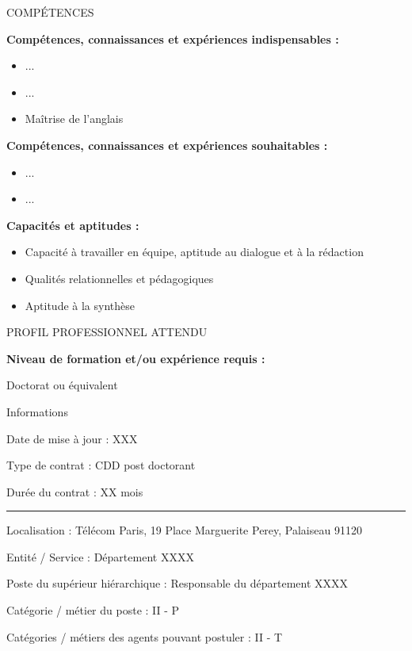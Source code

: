 \begin{graybox}{COMPÉTENCES}

{\bf Compétences, connaissances et expériences indispensables :}


\begin{itemize}
    \item ...
    \item ...
    \item Maîtrise de l'anglais
\end{itemize}

{\bf Compétences, connaissances et expériences souhaitables :}

\begin{itemize}
    \item ...
    \item ...
\end{itemize}


{\bf Capacités et aptitudes :}

\begin{itemize}
        \item  Capacité à travailler en équipe, aptitude au dialogue et à la rédaction
        \item  Qualités relationnelles et pédagogiques
        \item  Aptitude à la synthèse

\end{itemize}

\end{graybox}


\begin{graybox}{PROFIL PROFESSIONNEL ATTENDU  }

\textbf{Niveau de formation et/ou expérience requis :}

Doctorat ou équivalent 

\end{graybox}


\begin{redbox}{Informations}


Date de mise à jour :		XXX

Type de contrat : CDD post doctorant

Durée du contrat : XX mois

{ \color{redtp} \hspace{-5mm}\rule{1.073\linewidth}{0.5mm}}


Localisation :		Télécom Paris, 19 Place Marguerite Perey, Palaiseau 91120

Entité / Service : 	 Département XXXX

Poste du supérieur hiérarchique :	Responsable du département XXXX

Catégorie / métier du poste :	       II - P

Catégories / métiers des agents pouvant postuler : II - T



\end{redbox}


